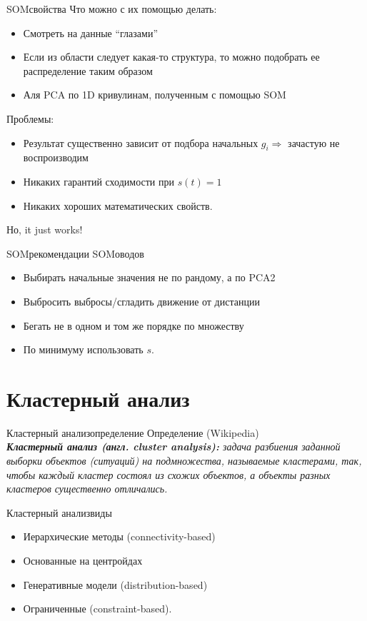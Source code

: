 \documentclass[14pt, fleqn, xcolor={dvipsnames, table}]{beamer}
\begin{document}
\begin{frame}{SOM}{свойства}
Что можно с их помощью делать:
\begin{itemize}
  \item Смотреть на данные ``глазами''
  \item Если из области следует какая-то структура, то можно подобрать ее распределение таким образом
  \item Аля PCA по 1D кривулинам, полученным с помощью SOM
\end{itemize}
Проблемы:
\begin{itemize}
  \item Результат существенно зависит от подбора начальных $g_i \Rightarrow$ зачастую не воспроизводим
  \item Никаких гарантий сходимости при $s(t) = 1$
  \item Никаких хороших математических свойств.
\end{itemize}
Но, it just works!
\end{frame}

\begin{frame}{SOM}{рекомендации SOMоводов}
\begin{itemize}
  \item Выбирать начальные значения не по рандому, а по PCA2
  \item Выбросить выбросы/сгладить движение от дистанции
  \item Бегать не в одном и том же порядке по множеству
  \item По минимуму использовать $s$.
\end{itemize}
\end{frame}

\section{Кластерный анализ}

\begin{frame}{Кластерный анализ}{определение}
{\color{blue}Определение (Wikipedia)} \\

\textit{\textbf{Кластерный анализ (англ. cluster analysis): }задача разбиения заданной выборки объектов (ситуаций) на подмножества, называемые кластерами, так, чтобы каждый кластер состоял из схожих объектов, а объекты разных кластеров существенно отличались.}
\end{frame}

\begin{frame}{Кластерный анализ}{виды}
\begin{itemize}
  \item Иерархические методы (connectivity-based)
  \item Основанные на центройдах
  \item Генеративные модели (distribution-based)
  \item Ограниченные (constraint-based).
\end{itemize}
\end{frame}
\end{document}
